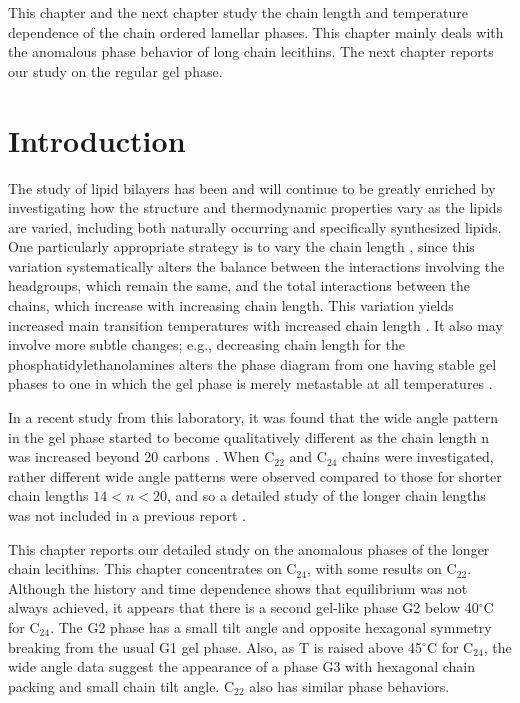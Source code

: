 This chapter and the next chapter study the chain length
and temperature dependence of the chain ordered lamellar phases.
This chapter mainly deals with the anomalous phase behavior
of long chain lecithins. The next chapter reports our study
on the regular gel phase.

\section{Introduction}

The study of lipid bilayers has been and will continue to be greatly enriched
by investigating how the structure and thermodynamic properties vary as the 
lipids are varied, including both naturally occurring and specifically
synthesized lipids. One particularly appropriate strategy
is to vary the chain length \cite{NW78,LMc87,Huang94,Cev91},
since this variation systematically alters the
balance between the interactions involving the headgroups,
which remain the same, and the total interactions between the chains, which 
increase with increasing chain length.
This variation yields increased main transition temperatures with 
increased chain length \cite{NW78,LMc87,Huang94,Cev91}.  It also
may involve more subtle changes; e.g., decreasing chain length 
for the phosphatidylethanolamines alters the phase diagram from one having
stable gel phases to one in which the gel phase is merely metastable at all 
temperatures \cite{WN84}.

In a recent study from this laboratory, it was found that the wide angle 
pattern in the gel phase started to become qualitatively different as 
the chain length n was increased beyond 20 carbons \cite{STN92}.  
When C$_{22}$ and C$_{24}$ chains were investigated, rather different wide 
angle patterns were observed compared to those for shorter chain lengths 
$14 < n < 20$, and so a detailed study of the longer chain lengths was not 
included in a previous report \cite{STN92}. 

This chapter reports our detailed study on the anomalous phases of 
the longer chain lecithins. This chapter concentrates on C$_{24}$, with
some results on C$_{22}$.  Although the history and time dependence 
shows that equilibrium was not always achieved, it appears that there 
is a second gel-like phase G2 below 40$^{\circ}$C for C$_{24}$. The G2 
phase has a small tilt angle and opposite hexagonal symmetry breaking 
from the usual G1 gel phase. Also, as T is raised above 45$^{\circ}$C 
for C$_{24}$, the wide angle data suggest the appearance of a phase 
G3 with hexagonal chain packing and small chain tilt angle. C$_{22}$
also has similar phase behaviors.
